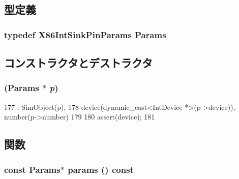\subsection{型定義}
\hypertarget{classX86ISA_1_1IntSinkPin_abcff199e0151f4485ac2e6deceb56b31}{
\subsubsection[{Params}]{\setlength{\rightskip}{0pt plus 5cm}typedef X86IntSinkPinParams {\bf Params}}}
\label{classX86ISA_1_1IntSinkPin_abcff199e0151f4485ac2e6deceb56b31}


\subsection{コンストラクタとデストラクタ}
\hypertarget{classX86ISA_1_1IntSinkPin_a46936e67518f4922d0bd3ad09fa25587}{
\subsubsection[{IntSinkPin}]{ ({\bf Params} $\ast$ {\em p})}}
\label{classX86ISA_1_1IntSinkPin_a46936e67518f4922d0bd3ad09fa25587}



\begin{DoxyCode}
177                           : SimObject(p),
178             device(dynamic_cast<IntDevice *>(p->device)), number(p->number)
179     {
180         assert(device);
181     }
\end{DoxyCode}


\subsection{関数}
\hypertarget{classX86ISA_1_1IntSinkPin_acd3c3feb78ae7a8f88fe0f110a718dff}{
\subsubsection[{params}]{\setlength{\rightskip}{0pt plus 5cm}const {\bf Params}$\ast$ params () const}}
\label{classX86ISA_1_1IntSinkPin_acd3c3feb78ae7a8f88fe0f110a718dff}



